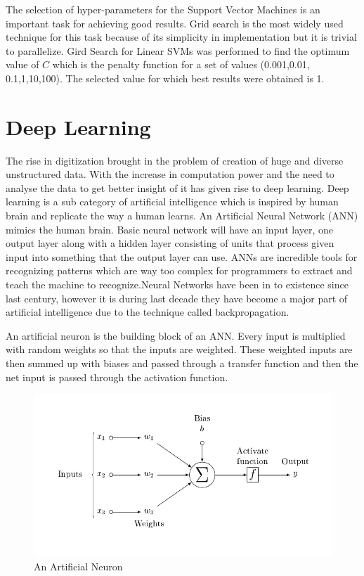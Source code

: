  


The selection of hyper-parameters for the Support Vector Machines is an important task for achieving good results. Grid search is the most widely used technique for this task because of its simplicity in implementation but it is trivial to parallelize. Gird Search for Linear SVMs was performed to find the optimum value of $C$ which is the penalty function for a set of values (0.001,0.01, 0.1,1,10,100). The selected value for which best results were obtained is 1.

\clearpage
\section{Deep Learning} \label{sec:DeepLearning}

The rise in digitization brought in the problem of creation of huge and diverse unstructured data. With the increase in computation power and the need to analyse the data to get better insight of it has given rise to deep learning. Deep learning is a sub category of artificial intelligence which is inspired by human brain and replicate the way a human learns. An Artificial Neural Network (ANN) mimics the human brain. Basic neural network will have an input layer, one output layer along with a hidden layer consisting of units that process given input into something that the output layer can use.   ANNs are incredible tools for recognizing patterns which are way too complex for programmers to extract and teach the machine to recognize.Neural Networks have been in to existence since last century, however it is during last decade they have become a major part of artificial intelligence due to the technique called backpropagation.

An artificial neuron is the building block of an ANN. Every input is multiplied with random weights so that the inputs are weighted.  These weighted inputs are then summed up with biases and passed through a transfer function and then the net input is passed through the activation function.

\begin{figure}[!ht]
    \centering
    \captionsetup{justification=centering,margin=2cm}
    \includegraphics[width=12cm]{pics/ArtificialNeuronModel.png}
    \caption{An Artificial Neuron}
    \label{fig:neuron}
\end{figure}

